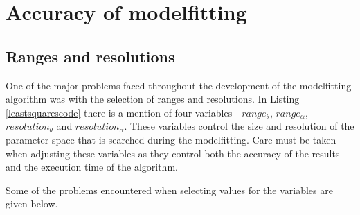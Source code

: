 \section{Accuracy of modelfitting}

\subsection{Ranges and resolutions}

One of the major problems faced throughout the development of the modelfitting algorithm was with the selection of ranges and resolutions.
In Listing \ref{leastsquarescode} there is a mention of four variables - $range_\theta$, $range_\alpha$, $resolution_\theta$ and $resolution_\alpha$.
These variables control the size and resolution of the parameter space that is searched during the modelfitting.
Care must be taken when adjusting these variables as they control both the accuracy of the results and the execution time of the algorithm.

Some of the problems encountered when selecting values for the variables are given below.


